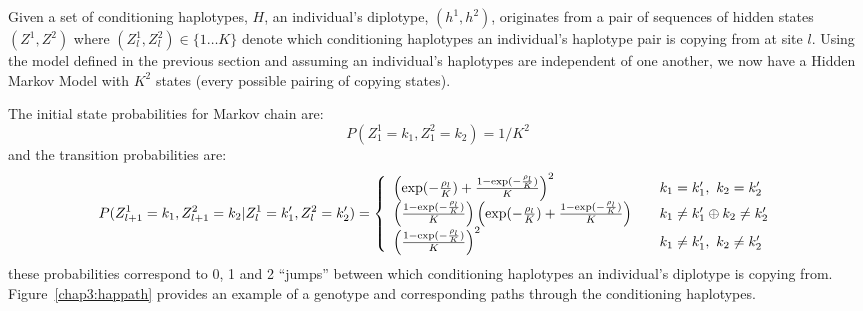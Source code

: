 Given a set of conditioning haplotypes, $H$, an individual's diplotype, $(h^1,h^2)$, originates from a pair of sequences of hidden states $(Z^1,Z^2)$ where $(Z^1_l,Z^2_l)\in\{1\ldots K\}$ denote which conditioning haplotypes  an individual's haplotype  pair is copying from at site $l$.  Using the model defined in the previous section and assuming an individual's haplotypes are independent of one another, we now have a Hidden Markov Model with $K^2$ states (every possible pairing of copying states). 

The initial state probabilities for Markov chain are:
$$P(Z_1^1=k_1,Z_1^2=k_2) = 1/K^2$$
and the transition probabilities are:
\small
\[ P(Z_{l+1}^1=k_1,Z_{l+1}^2=k_2 | Z_l^1=k_1',Z_l^2=k_2') = \left\{ 
  \begin{array}{l l}
    \left( \exp(-\frac{\rho_l}{K}) + \frac{1-\exp(-\frac{\rho_l}{K})}{K} \right) ^2 & \quad k_1=k_1',~k_2=k_2'\\
    \left( \frac{1-\exp(-\frac{\rho_l}{K})}{K} \right) \left( \exp(-\frac{\rho_l}{K}) + \frac{1-\exp(-\frac{\rho_l}{K})}{K} \right) & \quad k_1 \neq k_1' \oplus  k_2 \neq k_2'\\
    \left( \frac{1-\exp(-\frac{\rho_l}{K})}{K} \right)^2 & \quad k_1\neq k_1',~k_2\neq k_2'\\
  \end{array} \right.\label{chap3:jump}\] 
\normalsize
these probabilities correspond to 0, 1 and 2 ``jumps'' between which conditioning haplotypes an individual's diplotype is copying from. Figure~\ref{chap3:happath} provides an example of a genotype and corresponding paths through the conditioning haplotypes. 

